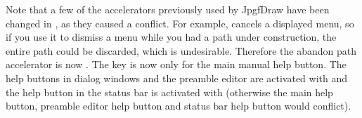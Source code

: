 \begin{warning}
Note that a few of the accelerators previously used by JpgfDraw have
been changed in \appname, as they caused a conflict. For example,
 cancels a displayed menu, so if you use it to
dismiss a menu while you had a \gls{path} under construction, the
entire path could be discarded, which is undesirable. Therefore the
abandon path accelerator is now . The
 key is now only for the main manual help
button. The help buttons in dialog windows and the preamble editor
are activated with  and the help button in the
status bar is activated with  (otherwise
the main help button, preamble editor help button and status bar
help button would conflict).
\end{warning}


